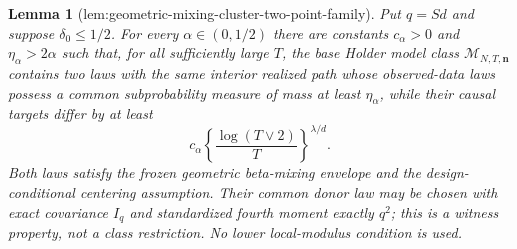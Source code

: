 \documentclass{article}
\newtheorem{lemma}{Lemma}
\begin{document}
\begin{lemma}[lem:geometric-mixing-cluster-two-point-family]\label{lem:geometric-mixing-cluster-two-point-family}
Put \(q=Sd\) and suppose \(\delta_0\le1/2\).  For every
\(\alpha\in(0,1/2)\) there are constants \(c_\alpha>0\) and
\(\eta_\alpha>2\alpha\) such that, for all sufficiently large \(T\), the
base Holder model class \(\mathcal M_{N,T,\mathbf n}\) contains two laws
with the same interior realized path whose observed-data laws possess a
common subprobability measure of mass at least \(\eta_\alpha\), while their
causal targets differ by at least
\[
 c_\alpha\left\{\frac{\log(T\vee2)}{T}\right\}^{\lambda/d}.
\]
Both laws satisfy the frozen geometric beta-mixing envelope and the
design-conditional centering assumption.  Their common donor law may be
chosen with exact covariance \(I_q\) and standardized fourth moment exactly
\(q^2\); this is a witness property, not a class restriction.  No lower
local-modulus condition is used.
\end{lemma}
\end{document}
